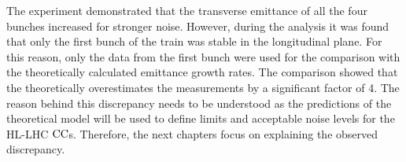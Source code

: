 The experiment demonstrated that the transverse emittance of all the four bunches increased for stronger noise. However, during the analysis it was found that only the first bunch of the train was stable in the longitudinal plane. For this reason, only the data from the first bunch were used for the comparison with the theoretically calculated emittance growth rates. The comparison showed that the theoretically overestimates the measurements by a significant factor of 4. The reason behind this discrepancy needs to be understood as the predictions of the theoretical model will be used to define limits and acceptable noise levels for the HL-LHC ${\mathrm{CC}}$s. Therefore, the next chapters focus on explaining the observed discrepancy.
